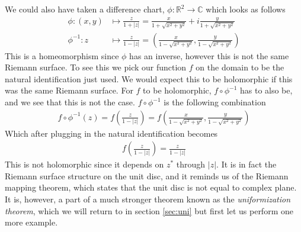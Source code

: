 \documentclass[lettersize,12pt]{article}
\begin{document}
We could also have taken a difference chart, $\phi:\mathds{R}^2\to \mathds{C}$ which looks as follows 
\begin{equation}
	\begin{aligned}
		\phi:(x,y)&\mapsto \frac{z}{1+|z|}=\frac{x}{1+\sqrt{x^2+y^2}}+i\frac{y}{1+\sqrt{x^2+y^2}}\\
		\phi^{-1}:z&\mapsto \frac{z}{1-|z|}=\left(\frac{x}{1-\sqrt{x^2+y^2}},\frac{y}{1-\sqrt{x^2+y^2}}\right)
	\end{aligned}
\end{equation}
This is a homeomorphism since $\phi$ has an inverse, however this is not the same Riemann surface. To see this we pick our function $f$ on the domain to be the natural identification just used. We would expect this to be holomorphic if this was the same Riemann surface. For $f$ to be holomorphic, $f\circ \phi^{-1}$ has to also be, and we see that this is not the case.  $f\circ \phi^{-1}$ is the following combination
\begin{equation}
	\begin{aligned}
		f\circ \phi^{-1}(z)=f\left(\frac{z}{1-|z|}\right)=f\left(\frac{x}{1-\sqrt{x^2+y^2}},\frac{y}{1-\sqrt{x^2+y^2}}\right)
	\end{aligned}
\end{equation}
Which after plugging in the natural identification becomes
\begin{equation}
	\begin{aligned}
		f\left(\frac{z}{1-|z|}\right)=\frac{z}{1-|z|}
	\end{aligned}
\end{equation}
This is not holomorphic since it depends on $z^*$ through $|z|$. It is in fact the Riemann surface structure on the unit disc, and it reminds us of the Riemann mapping theorem, which states that the unit disc is not equal to complex plane. It is, however, a part of a much stronger theorem known as the \textit{uniformization theorem}, which we will return to in section \ref{sec:uni} but first let us perform one more example.
\end{document}
